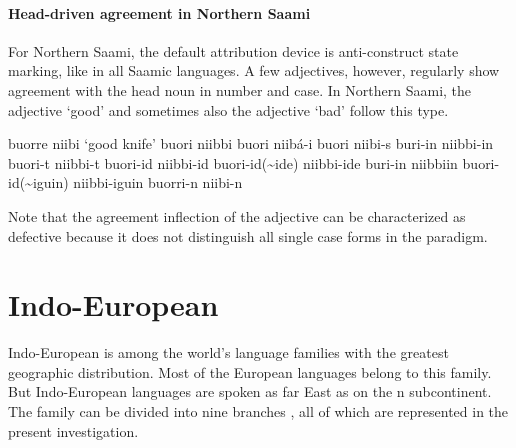 \paragraph*{Head\hyp{}driven agreement in Northern Saami}
For Northern Saami, the default attribution device is anti\hyp{}construct state marking, like in all Saamic languages. A few adjectives, however, regularly show agreement with the head noun in number and case. In Northern Saami, the adjective ‘good’ and sometimes also the adjective ‘bad’ follow this type.
\begin{exe}
\settowidth{}
\begin{xlist}
\ex	buorre niibi						{\rm ‘good knife’}	
\ex	buori niibbi										
\ex	buori niibá-i										
\ex	buori niibi-s										
\ex	buri-in niibbi-in										
\ex	buori-t niibbi-t										
\ex	buori-id niibbi-id									
\ex	buori-id(\textasciitilde ide) niibbi-ide						
\ex	buri-in niibbiin										
\ex	buori-id(\textasciitilde iguin) niibbi-iguin					
\ex	buorri-n niibi-n										
\end{xlist}
\end{exe}
Note that the agreement inflection of the adjective can be characterized as defective because it does not distinguish all single case forms in the paradigm.

\section{Indo-European}
Indo-European is among the world's language families with the greatest geographic distribution. Most of the European languages belong to this family. But Indo-European languages are spoken as far East as on the n subcontinent. The family can be divided into nine branches \citep[218]{salminen2007}, all of which are represented in the present investigation.

